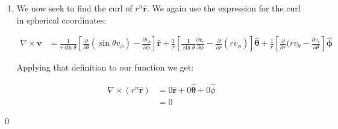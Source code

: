 \documentclass{homework}
\newcommand{\bs}[1]{\ensuremath{\boldsymbol{#1}}}
\newcommand{\bhat}[1]{\ensuremath{\boldsymbol{\hat{#1}}}}
\newcommand{\fracpd}[2]{
    \ensuremath{\frac{\partial #1}{\partial #2}}
  }
\begin{document}
\begin{homeworkProblem}[Problem 1.63]
{\begin{enumerate}
          We now verify that this is the same as the other half of the divergence theorem

          \begin{align*}
            \oint \bs{v} \cdot d \bs{a}  &= \oint (\frac{1}{R} \bhat{r} \cdot (R^2 \sin \theta d \theta d \phi \bhat{r})\\
              &= R \int_0^{\pi} \int_0^{2 \pi} \sin \theta d \theta d \phi \\
               &= 4 \pi R
          \end{align*}

          These two expressions are equal so we did calculate the divergence correctly.

          It doesn't look like there is a delta function at the origin because the function is linear in $R$.

          We now need an expression for the divergence of $r^n \bhat{r}$.   We will use the general form of the divergence in spherical coordinates from the book.

          \begin{align*}
            \nabla \cdot r^n \bhat{r} &= \frac{1}{r^2} \fracpd{}{r} (r^2 [r^n]) + 0  + 0 \\
              &= \frac{1}{r^2} \fracpd{}{r} (r^2 r^n) \\
              &= \frac{1}{r^2} (n + 2) r^{n + 1} \\
              &= (n + 2) r^{n - 1}
          \end{align*}

        \item We now seek to find the curl of $r^n \bhat{r}$.   We again use the expression for the curl in spherical coordinates:

        \begin{align*}
          \nabla \times \bs{v} &= \frac{1}{r \sin \theta} \left[\fracpd{}{\theta} (\sin \theta v_{\phi})  - \fracpd{v_{\theta}}{\phi}\right] \bhat{r} + \frac{1}{r} \left[ \frac{1}{\sin \theta} \fracpd{v_r}{\phi} - \fracpd{}{r}(rv_{\phi})\right] \bhat{\theta} + \frac{1}{r} \left[ \fracpd{}{r} (rv_{\theta} - \fracpd{v_r}{\theta} \right] \bhat{\phi}
        \end{align*}

        Applying that definition to our function we get:

        \begin{align*}
          \nabla \times (r^n \bhat{r}) &= 0 \bhat{r} + 0 \bhat{\theta} + 0 \hat{\phi} \\
            &= 0
        \end{align*}

     \end{enumerate}
     \qed
  }

\end{homeworkProblem}
\end{document}

